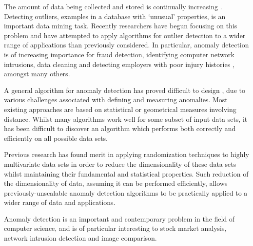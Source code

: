 The amount of data being collected and stored is continually increasing
\cite{Vries:2011}. Detecting outliers, examples in a database with `unusual'
properties, is an important data mining task. Recently researchers have begun
focusing on this problem and have attempted to apply algorithms for outlier
detection to a wider range of applications than previously considered. In
particular, anomaly detection is of increasing importance for fraud detection,
identifying computer network intrusions, data cleaning and detecting employers
with poor injury histories \cite{Bay:2003}, amongst many others.

A general algorithm for anomaly detection has proved difficult to design
\citeNeeded{}, due to various challenges associated with defining and measuring
anomalies. Most existing approaches are based on statistical or geometrical
measures involving distance. Whilst many algorithms work well for some subset of
input data sets, it has been difficult to discover an algorithm which performs
both correctly and efficiently on all possible data sets.

Previous research has found merit in applying randomization techniques to highly
multivariate data sets in order to reduce the dimensionality of these data sets
whilst maintaining their fundamental and statistical properties. Such reduction
of the dimensionality of data, assuming it can be performed efficiently, allows
previously-unscalable anomaly detection algorithms to be practically applied to
a wider range of data and applications.

Anomaly detection is an important and contemporary problem in the field of
computer science, and is of particular interesting to stock market analysis,
network intrusion detection and image comparison.
